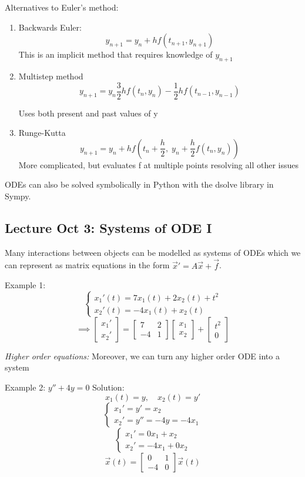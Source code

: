 \documentclass[12pt]{article}
\begin{document}
Alternatives to Euler's method: 
\begin{enumerate}
    \item Backwards Euler:
    \[y_{n+1} = y_n + hf(t_{n + 1}, y_{n + 1})\]
    This is an implicit method that requires knowledge of $y_{n + 1}$

    \item Multistep method 
    \[y_{n+1} = y_n \frac{3}{2}hf(t_n, y_n) - \frac{1}{2}hf(t_{n - 1}, y_{n -1})\] 

    Uses both present and past values of y

    \item Runge-Kutta 
    \[y_{n+ 1} = y_n + hf(t_n + \frac{h}{2}, \; y_n + \frac{h}{2} f(t_n, y_n))\]
    More complicated, but evaluates f at multiple points resolving all other issues
\end{enumerate}

ODEs can also be solved symbolically in Python with the dsolve library in Sympy.

\subsection*{Lecture Oct 3: Systems of ODE I}
Many interactions between objects can be modelled as systems of ODEs which we can represent as matrix equations in the form $\vec{x}' = A\vec{x} + \vec{f}$.

Example 1: 
\[\begin{cases}
    x_1'(t) = 7x_1(t) + 2x_2(t) + t^2\\
    x_2'(t) = -4x_1(t) + x_2(t)
\end{cases}\]
\[\implies \begin{bmatrix}
    x_1'\\
    x_2'
\end{bmatrix} = \begin{bmatrix}
    7 & 2\\
    -4 & 1
\end{bmatrix} \begin{bmatrix}
    x_1\\
    x_2
\end{bmatrix} + \begin{bmatrix}
    t^2\\
    0
\end{bmatrix}\]

\emph{Higher order equations:} Moreover, we can turn any higher order ODE into a system 

Example 2: $y'' + 4y = 0$
Solution:
\[x_1(t) = y, \quad x_2(t) = y'\]
\[\begin{cases}
    x_1' = y' = x_2\\
    x_2' = y'' = -4y = -4x_1
\end{cases}\]
\[\begin{cases}
    x_1' = 0x_1 + x_2\\
    x_2' = -4x_1 + 0x_2
\end{cases}\]
\[\vec{x}(t) = \begin{bmatrix}
    0 & 1\\
    -4 & 0
\end{bmatrix} \vec{x}(t)\]
\end{document}
